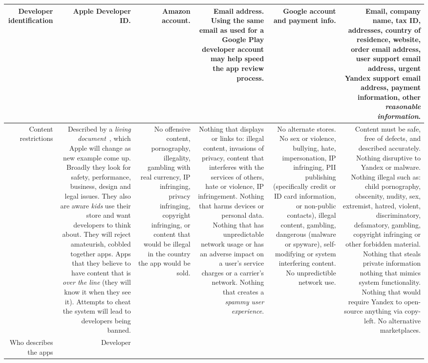 \documentclass[thesis.tex]{subfiles}
\begin{document}
{{\begin{longtable}{RRRRRR}
    Developer identification
 & Apple Developer ID.
 & Amazon account.
 & Email address.  Using the same email as used for a Google Play developer account may help speed the app review process.
 & Google account and payment info.
 & Email, company name, tax ID, addresses, country of residence, website, order email address, user support email address, urgent Yandex support email address, payment information, other \emph{reasonable information}.
                                              \\\midrule
    Content restrictions
 & Described by a \emph{living document}~\cite{apple_app_nodate}, which Apple will change as new example come up.  Broadly they look for safety, performance, business, design and legal issues. They also are aware \emph{kids} use their store and want developers to think about.  They will reject amateurish, cobbled together apps.  Apps that they believe to have content that is \emph{over the line} (they will know it when they see it).  Attempts to cheat the system will lead to developers being banned. 
 & No offensive content, pornography, illegality, gambling with real currency, IP infringing, privacy infringing, copyright infringing, or content that would be illegal in the country the app would be sold.
 & Nothing that displays or links to: illegal content, invasions of privacy, content that interferes with the services of others, hate or violence, IP infringement. Nothing that harms devices or personal data.  Nothing that has unpredictable network usage or has an adverse impact on a user's service charges or a carrier's network.  Nothing that creates a \emph{spammy user experience}.
 & No alternate stores. No sex or violence, bullying, hate, impersonation, IP infringing, PII publishing (specifically credit or ID card information, or non-public contacts), illegal content, gambling, dangerous (malware or spyware), self-modifying or system interfering content. No unpredictible network use.
 & Content must be safe, free of defects, and described accurately.  Nothing disruptive to Yandex or malware.  Nothing illegal such as: child pornography, obscenity, nudity, sex, extremist, hatred, violent, discriminatory, defamatory, gambling, copyright infringing or other forbidden material.  Nothing that steals private information nothing that mimics system functionality.  Nothing that would require Yandex to open-source anything via copy-left.  No alternative marketplaces.
                                              \\\midrule
    Who describes the apps
 & Developer

\end{longtable}}}
\end{document}
